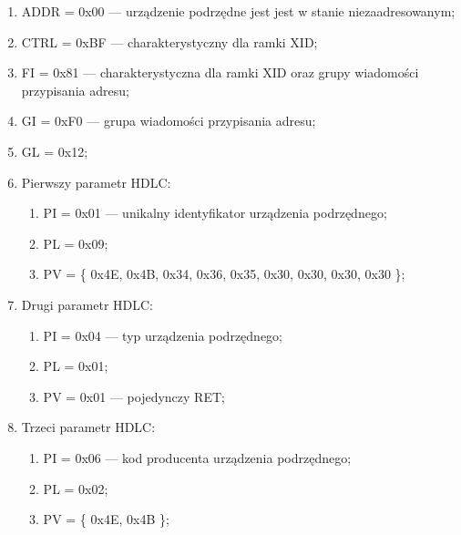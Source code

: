 \begin{enumerate}
    \item ADDR = 0x00 --- urządzenie podrzędne jest jest w stanie niezaadresowanym;
    \item CTRL = 0xBF --- charakterystyczny dla ramki XID;
    \item FI = 0x81 --- charakterystyczna dla ramki XID oraz grupy wiadomości przypisania adresu;
    \item GI = 0xF0 --- grupa wiadomości przypisania adresu;
    \item GL = 0x12;
    \item Pierwszy parametr HDLC:
    \begin{enumerate}
        \item PI = 0x01 --- unikalny identyfikator urządzenia podrzędnego;
        \item PL = 0x09;
        \item PV = \{ 0x4E, 0x4B, 0x34, 0x36, 0x35, 0x30, 0x30, 0x30, 0x30 \};
    \end{enumerate}
    \item Drugi parametr HDLC:
    \begin{enumerate}
        \item PI = 0x04 --- typ urządzenia podrzędnego;
        \item PL = 0x01;
        \item PV = 0x01 --- pojedynczy RET;
    \end{enumerate}
    \item Trzeci parametr HDLC:
    \begin{enumerate}
        \item PI = 0x06 --- kod producenta urządzenia podrzędnego;
        \item PL = 0x02;
        \item PV = \{ 0x4E, 0x4B \};
    \end{enumerate}
\end{enumerate}


